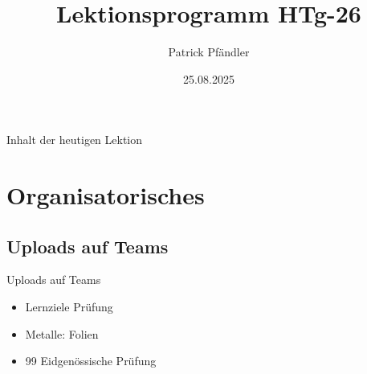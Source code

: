 



\title{\textbf{Lektionsprogramm HTg-26}}
\author{Patrick Pfändler}
\date{25.08.2025}




\frame{\titlepage}





\begin{frame}{Inhalt der heutigen Lektion}
    \tableofcontents
\end{frame}


\section{Organisatorisches}
\BlueSectionSlide

\subsection{Uploads auf Teams}
\begin{frame}{Uploads auf Teams}
    \begin{itemize}
        \item[\textbullet] Lernziele Prüfung
        \item[\textbullet] Metalle: Folien
        \item[\textbullet] 99 Eidgenössische Prüfung
    \end{itemize}

\end{frame}


